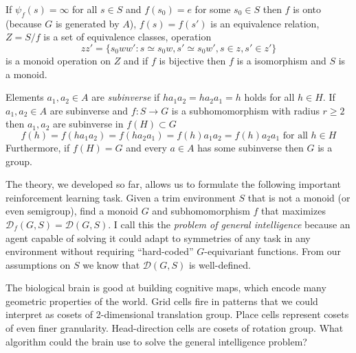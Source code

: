 \documentclass[12pt]{article}
\begin{document}
If $\psi_f(s)=\infty$ for all $s\in S$ and $f(s_0)=e$ for some $s_0\in S$ then $f$ is onto (because $G$ is generated by $A$), $f(s)=f(s')$ is an equivalence relation, $Z=S/f$ is a set of equivalence classes, operation \[
zz'=\{s_0ww':s\simeq s_0w, s'\simeq s_0w', s\in z, s' \in z'\}
\] 
is a monoid operation on $Z$ and if $f$ is bijective then $f$ is a isomorphism and $S$ is a monoid.

Elements $a_1,a_2\in A$ are \textit{subinverse} if $ha_1a_2=ha_2a_1=h$ holds for all $h\in H$. If $a_1,a_2\in A$ are subinverse and $f:S\rightarrow G$ is a subhomomorphism with radius $r\ge 2$ then $a_1,a_2$ are subinverse in $f(H)\subset G$
\[
f(h)=f(ha_1a_2)=f(ha_2a_1)=f(h)a_1a_2=f(h)a_2a_1\text{ for all }h\in H
\]
Furthermore, if $f(H)=G$ and every $a\in A$ has some subinverse then $G$ is a group.


The theory, we developed so far, allows us to formulate the following important reinforcement learning task. Given a trim environment $S$ that is not a monoid (or even semigroup), find a monoid $G$ and subhomomorphism $f$ that maximizes $\mathcal{D}_f(G,S)=\mathcal{D}(G,S)$. 
I call this the \textit{problem of general intelligence} because an agent capable of solving it could adapt to symmetries of any task in any environment without requiring ``hard-coded'' $G$-equivariant functions. From our assumptions on $S$ we know that $\mathcal{D}(G,S)$ is well-defined. 

The biological brain is good at building cognitive maps, which encode many geometric properties of the world. Grid cells fire in patterns that we could interpret as cosets of 2-dimensional translation group. Place cells represent cosets of even finer granularity. Head-direction cells are cosets of rotation group. What algorithm could the brain use to solve the general intelligence problem?
\end{document}
